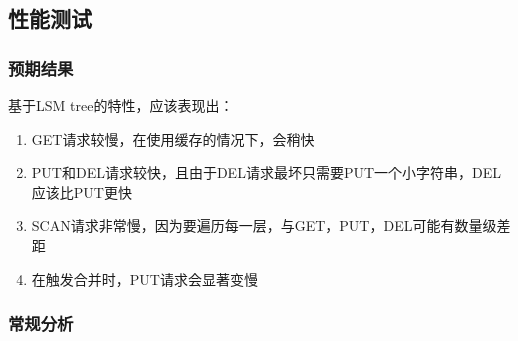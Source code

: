 \documentclass[UTF8]{article}
\begin{document}
\subsection{性能测试}


\subsubsection{预期结果}
基于LSM tree的特性，应该表现出：
\begin{enumerate}
\item GET请求较慢，在使用缓存的情况下，会稍快
\item PUT和DEL请求较快，且由于DEL请求最坏只需要PUT一个小字符串，DEL应该比PUT更快
\item SCAN请求非常慢，因为要遍历每一层，与GET，PUT，DEL可能有数量级差距
\item 在触发合并时，PUT请求会显著变慢
\end{enumerate}

\subsubsection{常规分析}
\end{document}
